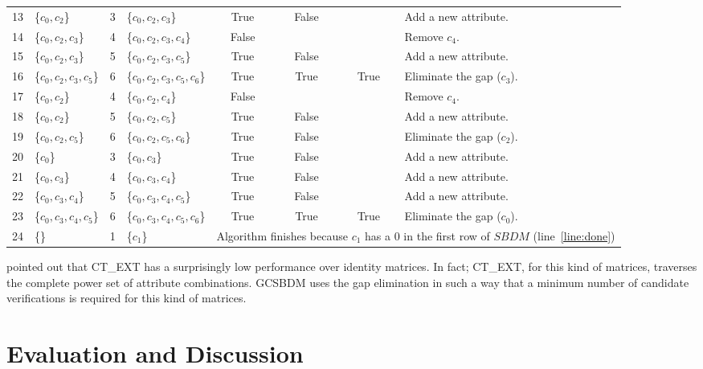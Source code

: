 \documentclass[authoryear,preprint,review,12pt]{elsarticle}
\begin{document}
\begin{table}[!htb]
\begin{tabular}{|c|l|c|l|c|c|c|l|}
    		13 & \{$c_0,c_2$\} 			& 3 & \{$c_0,c_2,c_3$\}			& True & False &   & Add a new attribute.\\
    		14 & \{$c_0,c_2,c_3$\} 		& 4 & \{$c_0,c_2,c_3,c_4$\}		& False &   &   & Remove $c_4$.\\
    		15 & \{$c_0,c_2,c_3$\}		& 5 & \{$c_0,c_2,c_3,c_5$\}		& True & False &   & Add a new attribute.\\
    		16 & \{$c_0,c_2,c_3,c_5$\}	& 6 & \{$c_0,c_2,c_3,c_5,c_6$\} 	& True & True & True & Eliminate the gap ($c_3$).\\
    		17 & \{$c_0,c_2$\} 			& 4 & \{$c_0,c_2,c_4$\}			& False &   &   & Remove $c_4$.\\
    		18 & \{$c_0,c_2$\}			& 5 & \{$c_0,c_2,c_5$\}			& True & False &   & Add a new attribute.\\
    		19 & \{$c_0,c_2,c_5$\}		& 6 & \{$c_0,c_2,c_5,c_6$\}		& True & False &   & Eliminate the gap ($c_2$).\\
    		20 & \{$c_0$\} 				& 3 & \{$c_0,c_3$\}				& True & False &   & Add a new attribute.\\    		
    		21 & \{$c_0,c_3$\}			& 4 & \{$c_0,c_3,c_4$\}			& True & False &   & Add a new attribute.\\
    		22 & \{$c_0,c_3,c_4$\}		& 5 & \{$c_0,c_3,c_4,c_5$\}		& True & False &   & Add a new attribute.\\
    		23 & \{$c_0,c_3,c_4,c_5$\}	& 6 & \{$c_0,c_3,c_4,c_5,c_6$\} 	& True & True & True & Eliminate the gap ($c_0$).\\
    		\hline
    		24 & \{\} 					& 1 & \{$c_1$\} 					& 
    		\multicolumn{4}{l|}{\scriptsize Algorithm finishes because $c_1$ has a 0 in the first row of $SBDM$ (line~\ref{line:done})}\\
    		\hline
		\end{tabular}
	\end{table}
	
	\cite{Alba14} pointed out that CT\_EXT has a surprisingly low performance over identity matrices. 
	In fact; CT\_EXT, for this kind of matrices, traverses the complete power set of attribute combinations. 
	GCSBDM uses the gap elimination in such a way that a minimum number of candidate verifications is required 
	for this kind of matrices.
%
\section{Evaluation and Discussion}\label{evaluation}
\end{document}
